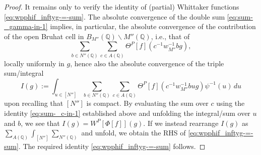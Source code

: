\documentclass[reqno]{amsart}
\theoremstyle{plain} \newtheorem{theorem} {Theorem}
\theoremstyle{definition} \newtheorem{definition} [theorem] {Definition}
\theoremstyle{itplain} %
\numberwithin{equation}{section}
\numberwithin{theorem}{section}
\begin{document}
\begin{proof}
  It remains only to verify the identity of (partial) Whittaker functions \eqref{eq:wpphif_inftyg-=-sum}.  The absolute convergence of the double sum \eqref{eq:sum-_gamma-in-1} implies, in particular, the absolute convergence of the contribution of the open Bruhat cell in ${B}_{M''}(\mathbb{Q}) \backslash M''(\mathbb{Q})$, i.e., that of
  \begin{equation*}
    \sum _{b \in N''(\mathbb{Q})}
    \sum _{c \in A(\mathbb{Q})}
    \Theta^P[f]
    (
    c^{-1} w_{M''}^{-1} b g
    ),
  \end{equation*}
  locally uniformly in $g$, hence also the absolute convergence of the triple sum/integral
  \begin{equation*}
    I(g)
    :=
    \int _{u \in [N'']}
    \sum _{b \in N''(\mathbb{Q})}
    \sum _{c \in A(\mathbb{Q})}
    \Theta^P[f]
    (
    c^{-1} w_{M''}^{-1} b u g
    ) \psi^{-1}(u) \, d u
  \end{equation*}
  upon recalling that $[N'']$ is compact.  By evaluating the sum over $c$ using the identity \eqref{eq:sum-_c-in-1} established above and unfolding the integral/sum over $u$ and $b$, we see that $I(g) = W^P[\Phi[f]](g)$.  If we instead rearrange $I(g)$ as $\sum_{A(\mathbb{Q}) } \int_{[N'']} \sum_{N''(\mathbb{Q})}$ and unfold, we obtain the RHS of \eqref{eq:wpphif_inftyg-=-sum}.  The required identity \eqref{eq:wpphif_inftyg-=-sum} follows.
\end{proof}
\end{document}
